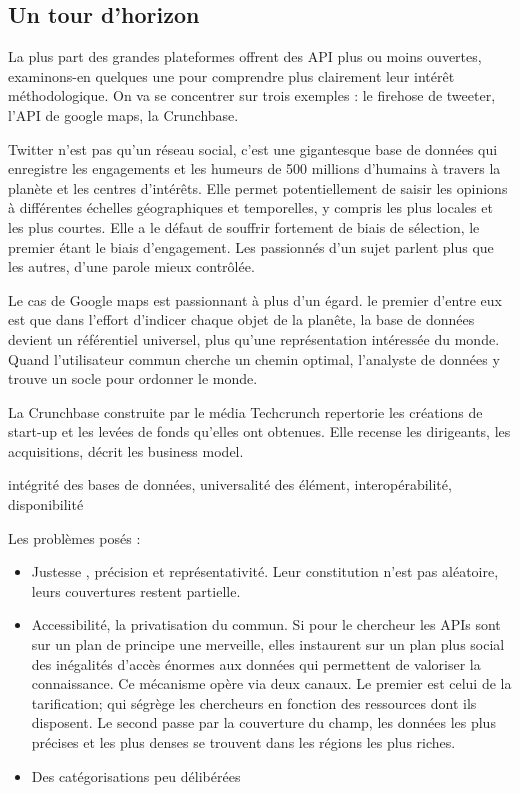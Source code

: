 \documentclass[
  letterpaper,
  DIV=11,
  numbers=noendperiod]{scrreprt}
\providecommand{\tightlist}{%
  \setlength{\itemsep}{0pt}\setlength{\parskip}{0pt}}\usepackage{longtable,booktabs,array}
\begin{document}
\subsection{Un tour d'horizon}\label{un-tour-dhorizon}

La plus part des grandes plateformes offrent des API plus ou moins
ouvertes, examinons-en quelques une pour comprendre plus clairement leur
intérêt méthodologique. On va se concentrer sur trois exemples : le
firehose de tweeter, l'API de google maps, la Crunchbase.

Twitter n'est pas qu'un réseau social, c'est une gigantesque base de
données qui enregistre les engagements et les humeurs de 500 millions
d'humains à travers la planète et les centres d'intérêts. Elle permet
potentiellement de saisir les opinions à différentes échelles
géographiques et temporelles, y compris les plus locales et les plus
courtes. Elle a le défaut de souffrir fortement de biais de sélection,
le premier étant le biais d'engagement. Les passionnés d'un sujet
parlent plus que les autres, d'une parole mieux contrôlée.

Le cas de Google maps est passionnant à plus d'un égard. le premier
d'entre eux est que dans l'effort d'indicer chaque objet de la planête,
la base de données devient un référentiel universel, plus qu'une
représentation intéressée du monde. Quand l'utilisateur commun cherche
un chemin optimal, l'analyste de données y trouve un socle pour ordonner
le monde.

La Crunchbase construite par le média Techcrunch repertorie les
créations de start-up et les levées de fonds qu'elles ont obtenues. Elle
recense les dirigeants, les acquisitions, décrit les business model.

intégrité des bases de données, universalité des élément,
interopérabilité, disponibilité

Les problèmes posés :

\begin{itemize}
\tightlist
\item
  Justesse , précision et représentativité. Leur constitution n'est pas
  aléatoire, leurs couvertures restent partielle.
\item
  Accessibilité, la privatisation du commun. Si pour le chercheur les
  APIs sont sur un plan de principe une merveille, elles instaurent sur
  un plan plus social des inégalités d'accès énormes aux données qui
  permettent de valoriser la connaissance. Ce mécanisme opère via deux
  canaux. Le premier est celui de la tarification; qui ségrège les
  chercheurs en fonction des ressources dont ils disposent. Le second
  passe par la couverture du champ, les données les plus précises et les
  plus denses se trouvent dans les régions les plus riches.
\item
  Des catégorisations peu délibérées
\end{itemize}
\end{document}
